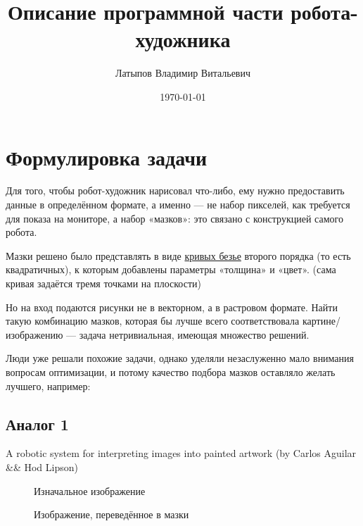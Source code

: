 \documentclass[11pt]{article}
\title{Описание программной части робота-художника}
\author{Латыпов Владимир Витальевич}
\date{\today}
\begin{document}
    \maketitle
    \newpage
    \tableofcontents
    \newpage

    \section{Формулировка задачи}\label{sec:formulating_task}

    Для того, чтобы робот-художник нарисовал что-либо, ему нужно предоставить данные в определённом формате, а именно — не набор пикселей,
    как требуется для показа на мониторе, а набор «мазков»: это связано с конструкцией самого робота.

    Мазки решено было представлять в виде \href{https://en.wikipedia.org/wiki/B\%C3\%A9zier_curve}{кривых безье} второго порядка (то есть квадратичных), к которым добавлены параметры «толщина» и «цвет».
    (сама кривая задаётся тремя точками на плоскости)

    Но на вход подаются рисунки не в векторном, а в растровом формате.
    Найти такую комбинацию мазков, которая бы лучше всего соответствовала картине/изображению — задача нетривиальная, имеющая множество решений.

    Люди уже решали похожие задачи, однако уделяли незаслуженно мало внимания вопросам оптимизации,
    и потому качество подбора мазков оставляло желать лучшего, например:

    \subsection{Аналог 1}
    A robotic system for interpreting images into painted artwork (by Carlos Aguilar \&\& Hod Lipson)

    \begin{figure}[h!]
        \centering
        \caption{Изначальное изображение}
        \label{fig:initial_hod}
    \end{figure}

    \begin{figure}[h!]
        \centering
        \caption{Изображение, переведённое в мазки}
        \label{fig:result_hod}
    \end{figure}
\end{document}
